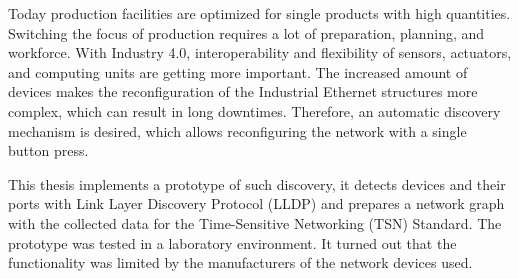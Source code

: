 Today production facilities are optimized for single products with high quantities. Switching the focus of production requires a lot of preparation, planning, and workforce. With Industry 4.0, interoperability and flexibility of sensors, actuators, and computing units are getting more important. The increased amount of devices makes the reconfiguration of the Industrial Ethernet structures more complex, which can result in long downtimes. Therefore, an automatic discovery mechanism is desired, which allows reconfiguring the network with a single button press.

This thesis implements a prototype of such discovery, it detects devices and their ports with Link Layer Discovery Protocol (LLDP) and prepares a network graph with the collected data for the Time-Sensitive Networking (TSN) Standard. The prototype was tested in a laboratory environment. It turned out that the functionality was limited by the manufacturers of the network devices used.